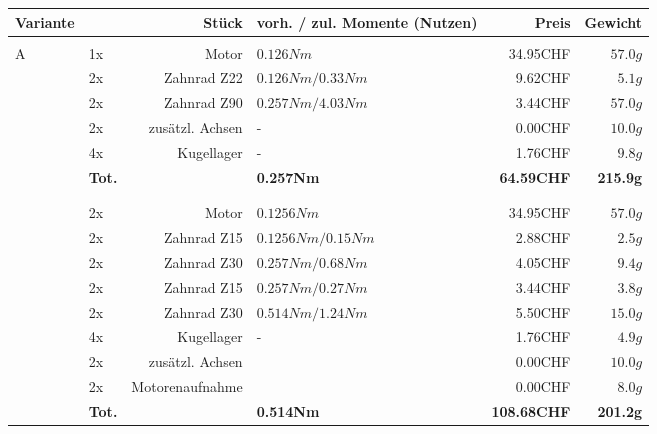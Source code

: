 \begin{figure}[h!]
    \begin{tabular}{p{0.5cm}p{0.8cm}rp{3cm}rr}
    \textbf{Variante} & \multicolumn{2}{r}{\textbf{Stück}} & \textbf{vorh. / zul. Momente (Nutzen)} & \textbf{Preis} & \textbf{Gewicht} \\\hline
          &       &                 &                      &          &  \\
    \multirow{9}[2]{*}{A}
          & 1x    & Motor           & $0.126 Nm$           & 34.95CHF & $57.0 g$ \\
          & 2x    & Zahnrad Z22     & $0.126 Nm / 0.33 Nm$ &  9.62CHF & $5.1 g$  \\
          & 2x    & Zahnrad Z90     & $0.257 Nm / 4.03 Nm$ &  3.44CHF & $57.0 g$ \\
          & 2x    & zusätzl. Achsen & -                    &  0.00CHF & $10.0 g$ \\
          & 4x    & Kugellager      & -                    &  1.76CHF & $9.8 g$  \\
          & \textbf{Tot.} &  & \textbf{0.257Nm} & \textbf{64.59CHF} & \textbf{215.9g} \\
    \multirow{10}[2]{*}{B}
  	  &       &                 &                      &          &  \\
          &       &                 &                      &          &  \\
          & 2x    & Motor           & $0.1256 Nm$          & 34.95CHF & $57.0 g$ \\
          & 2x    & Zahnrad Z15     & $0.1256 Nm / 0.15 Nm$& 2.88CHF  & $2.5 g$  \\
          & 2x    & Zahnrad Z30     & $0.257 Nm / 0.68 Nm$ & 4.05CHF  & $9.4 g$  \\
          & 2x    & Zahnrad Z15     & $0.257 Nm / 0.27 Nm$ & 3.44CHF  & $3.8 g$  \\
          & 2x    & Zahnrad Z30     & $0.514 Nm / 1.24 Nm$ & 5.50CHF  & $15.0 g$ \\
          & 4x    & Kugellager      & -                    & 1.76CHF  & $4.9 g$  \\
          & 2x    & zusätzl. Achsen &                      & 0.00CHF  & $10.0 g$ \\
          & 2x    & Motorenaufnahme &                      & 0.00CHF  & $8.0 g$  \\
          & \textbf{Tot.} &       & \textbf{0.514Nm} & \textbf{108.68CHF} & \textbf{201.2g} \\

\end{tabular}
\end{figure}
